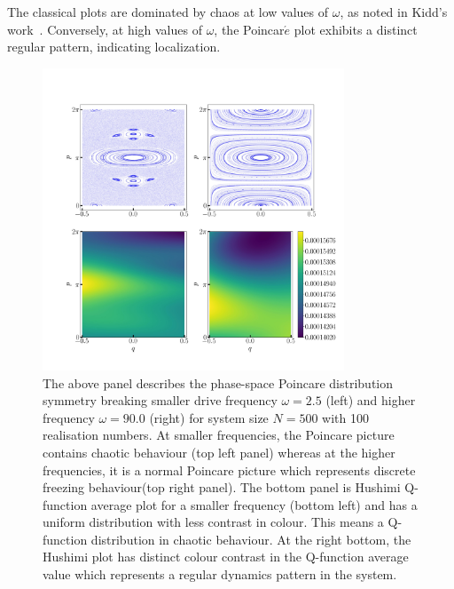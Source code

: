 \documentclass[%
reprint,
superscriptaddress,
amsmath,amssymb,
aps,
prb,
showkeys,
]{revtex4-2}
\begin{document}
	The classical plots are dominated by chaos at low values of $\omega$, as noted in Kidd's work~\cite{Kidd2019}. Conversely, at high values of $\omega$, the Poincar$\acute{e}$ plot exhibits a distinct regular pattern, indicating localization.
	\begin{figure}[ht!]
		\centering
		\includegraphics[height = 9.0cm, width = 9.0 cm]{lmg_poincare.jpeg}
		\caption{The above panel describes the phase-space Poincare distribution symmetry breaking smaller drive frequency $\omega = 2.5$ (left) and higher frequency $\omega = 90.0$ (right) for system size $N=500$ with 100 realisation numbers. At smaller frequencies, the Poincare picture contains chaotic behaviour (top left panel) whereas at the higher frequencies, it is a normal Poincare picture which represents discrete freezing behaviour(top right panel). The bottom panel is Hushimi Q-function average plot for  a smaller frequency (bottom left) and has a uniform distribution with less contrast in colour. This means a Q-function distribution in chaotic behaviour. At the right bottom, the Hushimi plot has distinct colour contrast in the Q-function average value which represents a regular dynamics pattern in the system.}
		\label{fig:classical_lipkin}
	\end{figure}
\end{document}

